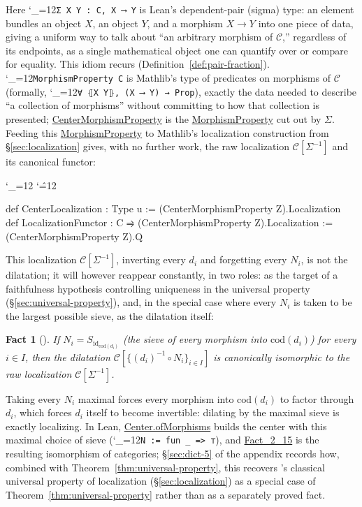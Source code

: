 \documentclass[11pt]{amsart}
\newcommand{\lc}[1]{\url{#1}}
\newcommand{\lcode}{\begingroup\catcode`\_=12\relax\lcodeInner}
\newcommand{\lcodeInner}[1]{\texttt{#1}\endgroup}
\newenvironment{leancode}{%
  \begingroup
  \catcode`\_=12\relax
  \catcode`\^=12\relax
  \small\ttfamily\raggedright\baselineskip=1.15\baselineskip
  \par\smallskip\noindent
}{%
  \par\smallskip
  \endgroup
}
\theoremstyle{plain}
\newtheorem{fact}[theorem]{Fact}
\theoremstyle{definition}
\theoremstyle{remark}
\newcommand{\calC}{\mathcal C}
\newcommand{\id}{\mathrm{id}}
\newcommand{\cod}{\mathrm{cod}}
\begin{document}
Here \lcode{Σ X Y : C, X ⟶ Y} is Lean's dependent-pair (sigma) type: an element bundles an
object $X$, an object $Y$, and a morphism $X \to Y$ into one piece of data, giving a uniform
way to talk about ``an arbitrary morphism of $\calC$,'' regardless of its endpoints, as a
single mathematical object one can quantify over or compare for equality. This idiom recurs (Definition~\ref{def:pair-fraction}). \lcode{MorphismProperty C} is
Mathlib's type of predicates on morphisms of $\calC$ (formally,
\lcode{∀ ⦃X Y⦄, (X ⟶ Y) → Prop}), exactly the data needed to describe ``a collection of
morphisms'' without committing to how that collection is presented; \lc{CenterMorphismProperty}
is the \lc{MorphismProperty} cut out by $\Sigma$. Feeding this \lc{MorphismProperty} to
Mathlib's localization construction from \S\ref{sec:localization} gives, with no further
work, the raw localization $\calC[\Sigma^{-1}]$ and its canonical functor:

\begin{leancode}
def CenterLocalization : Type u := (CenterMorphismProperty Z).Localization \\[0.5\baselineskip]
def LocalizationFunctor : C ⥤ (CenterMorphismProperty Z).Localization := \\
  (CenterMorphismProperty Z).Q \\
\end{leancode}

This localization $\calC[\Sigma^{-1}]$, inverting every $d_i$ and forgetting every $N_i$, is
not the dilatation; it will however reappear constantly, in two roles: as the target of a
faithfulness hypothesis controlling uniqueness in the universal property
(\S\ref{sec:universal-property}), and, in the special case where every $N_i$ is taken to be
the largest possible sieve, as the dilatation itself:

\begin{fact}[{\citep[Fact~2.15]{Mayeux}}]
\label{fact:localization-is-dilatation}
If $N_i = S_{\id_{\cod(d_i)}}$ (the sieve of every morphism into $\cod(d_i)$) for
every $i \in I$, then the dilatation $\calC[\{(d_i)^{-1}\circ N_i\}_{i\in I}]$ is canonically
isomorphic to the raw localization $\calC[\Sigma^{-1}]$.
\end{fact}

Taking every $N_i$ maximal forces every morphism into $\cod(d_i)$ to factor through $d_i$,
which forces $d_i$ itself to become invertible: dilating by the maximal sieve is exactly
localizing. In Lean, \lc{Center.ofMorphisms} builds the center with this maximal choice of
sieve (\lcode{N := fun _ => ⊤}), and \lc{Fact_2_15} is the resulting isomorphism of
categories; \S\ref{sec:dict-5} of the appendix records how, combined with
Theorem~\ref{thm:universal-property}, this recovers \citep[Proposition~2.8]{Mayeux}'s classical universal
property of localization (\S\ref{sec:localization}) as a special case of
Theorem~\ref{thm:universal-property} rather than as a separately proved fact.
\end{document}
